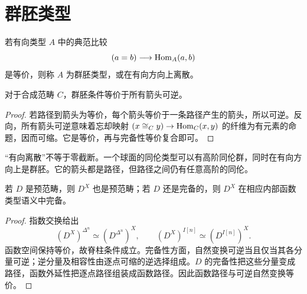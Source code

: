 \section{群胚类型}
\begin{definition}[群胚或有向离散类型]
若有向类型 $A$ 中的典范比较
\[
(a=b)\longrightarrow\operatorname{Hom}_A(a,b)
\]
是等价，则称 $A$ 为群胚类型，或在有向方向上离散。
\end{definition}
\begin{proposition}
对于合成范畴 $C$，群胚条件等价于所有箭头可逆。
\end{proposition}
\begin{proof}
若路径到箭头为等价，每个箭头等价于一条路径产生的箭头，所以可逆。反向，所有箭头可逆意味着忘却映射 $(x\cong_Cy)\to\operatorname{Hom}_C(x,y)$ 的纤维为有元素的命题，因而可缩。它是等价，再与完备性等价复合即可。
\end{proof}
\begin{remark}
“有向离散”不等于零截断。一个球面的同伦类型可以有高阶同伦群，同时在有向方向上是群胚。它的箭头都是路径，但路径之间仍有任意高阶的同伦。
\end{remark}
\begin{proposition}[函数空间的封闭性]
若 $D$ 是预范畴，则 $D^X$ 也是预范畴；若 $D$ 还是完备的，则 $D^X$ 在相应内部函数类型语义中完备。
\end{proposition}
\begin{proof}
指数交换给出
\[
(D^X)^{\Delta^n}\simeq(D^{\Delta^n})^X,
\qquad
(D^X)^{I[n]}\simeq(D^{I[n]})^X.
\]
函数空间保持等价，故脊柱条件成立。完备性方面，自然变换可逆当且仅当其各分量可逆；逆分量及相容性由逐点可缩的逆选择组成。$D$ 的完备性把这些分量变成路径，函数外延性把逐点路径组装成函数路径。因此函数路径与可逆自然变换等价。
\end{proof}
